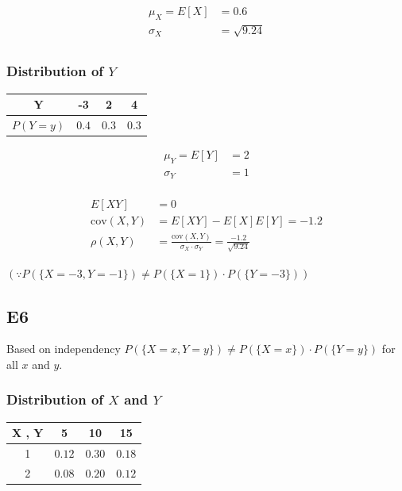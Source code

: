 \documentclass[12pt, a4paper]{article}
\begin{document}
\begin{align*}
\mu_X = E[X] &= 0.6 \\
\sigma_X &= \sqrt{9.24} \\
\end{align*}

\subsubsection*{Distribution of $Y$}
\begin{table}[h]
\centering
\begin{tabular}{|c|c|c|c|}
\hline
Y & -3 & 2 & 4 \\
\hline
$P(Y = y)$ & $0.4$ & $0.3$ & $0.3$ \\
\hline
\end{tabular}
\end{table}

\begin{align*}
\mu_Y = E[Y] &= 2 \\
\sigma_Y &= 1 \\
\end{align*}

\begin{align*}
E[XY] &= 0 \\
\text{cov}(X,Y) &= E[XY] - E[X]E[Y] = \boxed{-1.2} \\
\rho(X,Y) &= \frac{\text{cov}(X,Y)}{\sigma_X \cdot \sigma_Y} = \boxed{\frac{-1.2}{\sqrt{9.24}}}
\end{align*}


$(\because P( \{ X = -3, Y = -1 \} ) \neq P( \{X = 1 \} ) \cdot P( \{ Y = -3 \} ) )$

\subsection* {E6}

Based on independency $P( \{ X = x, Y = y \} ) \neq P( \{X = x \} ) \cdot P( \{ Y = y \} )$ for all $x$ and $y$.

\subsubsection*{Distribution of $X$ and $Y$}
\begin{table}[h]
\centering
\begin{tabular}{|c|c|c|c|}
\hline
X , Y & 5 & 10 & 15 \\
\hline
1 & $0.12 $ & $0.30$ & $0.18$ \\
2 & $0.08$ & $0.20$ & $0.12$ \\
\hline
\end{tabular}
\end{table}
\end{document}
